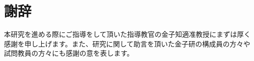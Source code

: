\chapter*{謝辞}

本研究を進める際にご指導をして頂いた指導教官の金子知適准教授にまずは厚く感謝を申し上げます。また、研究に関して助言を頂いた金子研の構成員の方々や試問教員の方々にも感謝の意を表します。
